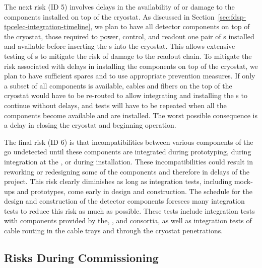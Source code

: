 The next risk (ID 5) involves delays in the availability of or
damage to the  components installed on top of the
cryostat. As discussed in Section~\ref{sec:fdsp-tpcelec-integration-timeline},
we plan to have all  detector components on top of the cryostat, those 
required to power, control, and readout one pair of s installed
and available before inserting the s into the cryostat.
This allows extensive testing of s to mitigate
the risk of damage to the readout chain. To mitigate the risk associated with
delays in installing the  components on top of the cryostat,
we plan to have sufficient spares and to use appropriate  
prevention measures. If only a subset of all components is available, cables 
and fibers on the top of the cryostat would have to be re-routed to allow  
integrating and installing the s to continue without delays, 
and tests will have to be repeated when all the components become available 
and are installed. The worst possible consequence is a delay in closing 
the cryostat and beginning operation. 

The final risk (ID 6) is that incompatibilities 
between various components of the   go undetected until
these components are integrated during prototyping, during integration at 
the , or during installation. These incompatibilities could 
result in reworking or redesigning some of the components and therefore in
delays of the project. This risk clearly
diminishes as long as integration tests, including mock-ups and prototypes,
come early in design and construction. The schedule for the 
design and construction of the  detector components foresees many
integration tests to reduce this risk as much as possible. These tests include integration tests with components provided
by the, , and  consortia, as well as integration
tests of cable routing in the cable trays and through the cryostat
penetrations. 

\subsection{Risks During Commissioning}
\label{sec:fdsp-tpcelec-risks-commissioning}

